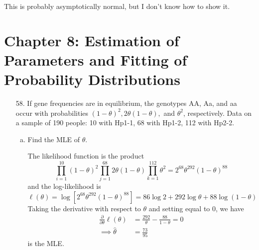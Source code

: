 \documentclass{article}
\begin{document}
\begin{enumerate}
\begin{enumerate}[a)]
\begin{soln}
					This is probably asymptotically normal, but I don't know how to show it.

				\end{soln}
				
		\end{enumerate}
		
\end{enumerate}

\newpage
\section*{Chapter 8: Estimation of Parameters and Fitting of Probability Distributions}

\begin{itemize}
	\item[58.] If gene frequencies are in equilibrium, the genotypes AA, Aa, and aa occur with probabilities $(1-\theta)^2, 2\theta(1-\theta),$ and $\theta^2$, respectively. Data on a sample of 190 people: 10 with Hp1-1, 68 with Hp1-2, 112 with Hp2-2.

		\begin{enumerate}[a.]
			\item Find the MLE of $\theta.$
				\begin{soln}
					The likelihood function is the product \[\prod_{i=1}^{10} (1-\theta)^2 \prod_{j=1}^{68} 2\theta(1-\theta)\prod_{k=1}^{112} \theta^2 = 2^{68} \theta^{292}(1-\theta)^{88}\] and the log-likelihood is \[\ell(\theta) = \log\left[ 2^{68}\theta^{292}(1-\theta)^{88} \right]=86\log 2 + 292\log \theta + 88\log(1-\theta)\] Taking the derivative with respect to $\theta$ and setting equal to 0, we have
					\begin{align*}
						\frac{\partial}{\partial\theta}\ell(\theta) &= \frac{292}{\theta}-\frac{88}{1-\theta} = 0 \\
						\implies \hat{\theta} &= \frac{73}{95}
					\end{align*} is the MLE.
					
				\end{soln}


\end{enumerate}
\end{itemize}
\end{document}
